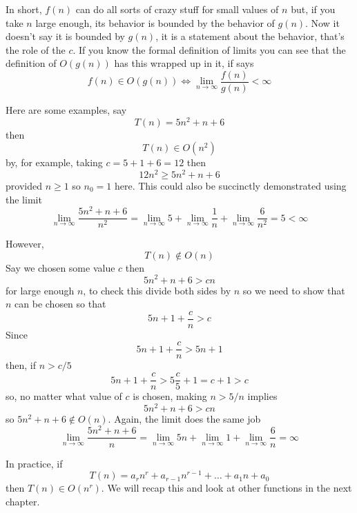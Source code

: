 \documentclass[11pt,a4paper]{scrartcl}
\begin{document}
In short, $f(n)$ can do all sorts of crazy stuff for small values of
$n$ but, if you take $n$ large enough, its behavior is bounded by the
behavior of $g(n)$. Now it doesn't say it is bounded by $g(n)$, it is
a statement about the behavior, that's the role of the $c$. If you
know the formal definition of limits you can see that the definition
of $O(g(n))$ has this wrapped up in it, if says
\begin{equation}
f(n)\in O(g(n))\iff \lim_{n\rightarrow \infty}\frac{f(n)}{g(n)}<\infty
\end{equation}

Here are some examples, say 
\begin{equation}
T(n)=5n^2+n+6
\end{equation}
then 
\begin{equation}
T(n)\in O(n^2)
\end{equation}
by, for example, taking $c=5+1+6=12$ then 
\begin{equation}
12n^2\ge 5n^2+n+6
\end{equation}
provided $n\ge 1$ so $n_0=1$ here. This could also be succinctly
demonstrated using the limit
\begin{equation}
\lim_{n\rightarrow \infty} \frac{5n^2+n+6}{n^2}=\lim_{n\rightarrow \infty}5+\lim_{n\rightarrow \infty}\frac{1}{n}+\lim_{n\rightarrow \infty}\frac{6}{n^2}=5<\infty
\end{equation}

However, 
\begin{equation}
T(n)\not\in O(n)
\end{equation}
Say we chosen some value $c$ then
\begin{equation}
5n^2+n+6>cn
\end{equation}
for large enough $n$, to check this divide both sides by $n$ so we need to show that $n$ can be chosen so that
\begin{equation}
5n+1+\frac{c}{n}>c
\end{equation}
Since 
\begin{equation}
5n+1+\frac{c}{n}>5n+1
\end{equation}
then, if $n>c/5$
\begin{equation}
5n+1+\frac{c}{n}>5\frac{c}{5}+1=c+1>c
\end{equation}
so, no matter what value of $c$ is chosen, making $n>5/n$ implies
\begin{equation}
5n^2+n+6>cn
\end{equation}
so $5n^2+n+6\not\in O(n)$. Again, the limit does the same job
\begin{equation}
\lim_{n\rightarrow \infty} \frac{5n^2+n+6}{n}=\lim_{n\rightarrow \infty}5n+\lim_{n\rightarrow \infty}1+\lim_{n\rightarrow \infty}\frac{6}{n}=\infty
\end{equation}


In practice, if
\begin{equation}
T(n)=a_rn^r+a_{r-1}n^{r-1}+\ldots+a_1n+a_0
\end{equation}
then $T(n)\in O(n^r)$. We will recap this and look at other functions in the next chapter.
\end{document}
